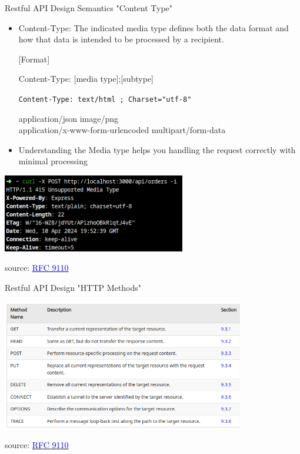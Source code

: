 \documentclass{beamer}
\newcommand{\code}[1]{\colorbox{codegray}{\texttt{#1}}}
\begin{document}
\begin{frame}[t]{Restful API Design Semantics "Content Type"}
	\scriptsize	
		\begin{itemize}
			\item Content-Type: The indicated media type defines both the data format and how that data is intended to be processed by a recipient.
			\item[] [Format]
			\item[] Content-Type: [media type];[subtype]
			\item[] \code{Content-Type: text/html ; Charset="utf-8"}   
			\begin{examples}
				application/json 				   \hfill image/png   			\\
				application/x-www-form-urlencoded  \hfill multipart/form-data   \\
			\end{examples}
			\item \alert{Understanding the Media type helps you handling the request correctly with minimal processing}
		\end{itemize}	
		
		
		\begin{center}
   			\includegraphics[width=0.6\textwidth, height=0.3\textheight]{img/unspported-media-type.png}
		\end{center}		
	
	  \tiny source: \href{https://www.rfc-editor.org/rfc/rfc9110.html} {\textcolor{blue}{RFC 9110}} 
\end{frame}

\begin{frame}[t]{Restful API Design "HTTP Methods"}
		
		\begin{center}
   			\includegraphics[width=0.8\textwidth, height=0.6\textheight]{img/http-methods.png}
		\end{center}		
	
	  \tiny source: \href{https://www.rfc-editor.org/rfc/rfc9110.html} {\textcolor{blue}{RFC 9110}} 
\end{frame}
\end{document}

